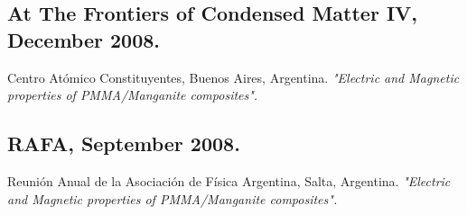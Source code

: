 \subsection{At The Frontiers of Condensed Matter IV, December 2008.} Centro Atómico Constituyentes, Buenos Aires, Argentina. \emph{"Electric and Magnetic properties of PMMA/Manganite composites". }

\subsection{RAFA, September 2008.} Reunión Anual de la Asociación de Física Argentina, Salta, Argentina. \emph{"Electric and Magnetic properties of PMMA/Manganite composites". }

